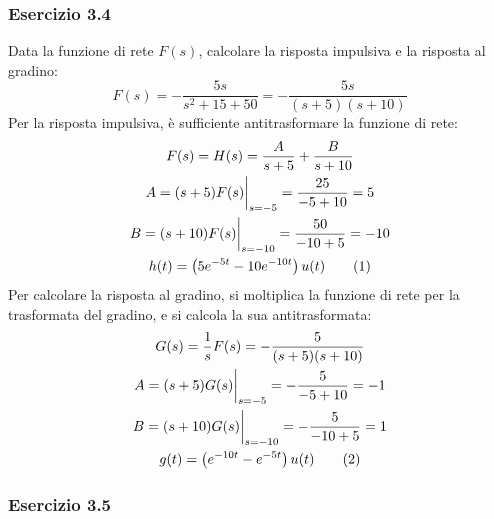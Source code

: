\documentclass{article}
\newcommand{\tageq}{\tag{\stepcounter{equation}\theequation}}
\begin{document}
\subsubsection*{Esercizio 3.4}

Data la funzione di rete $F(s)$, calcolare la risposta impulsiva e la risposta al gradino:
\begin{equation*}
    F(s)=\displaystyle-\frac{5s}{s^2+15+50}=-\frac{5s}{(s+5)(s+10)}
\end{equation*}
Per la risposta impulsiva, è sufficiente antitrasformare la funzione di rete:
\begin{gather*}
    F(s)=H(s)=\displaystyle\frac{A}{s+5}+\frac{B}{s+10}\\
    A=(s+5)F(s)\bigg|_{s=-5}=\displaystyle\frac{25}{-5+10}=5\\
    B=(s+10)F(s)\bigg|_{s=-10}=\displaystyle\frac{50}{-10+5}=-10\\
    h(t)=\displaystyle\left(5e^{-5t}-10e^{-10t}\right)u(t)\tageq
\end{gather*}
Per calcolare la risposta al gradino, si moltiplica la funzione di rete per la trasformata del gradino, e si calcola la sua antitrasformata:
\begin{gather*}
    G(s)=\displaystyle\frac{1}{s}F(s)=-\frac{5}{(s+5)(s+10)}\\
    A=(s+5)G(s)\bigg|_{s=-5}=-\frac{5}{-5+10}=-1\\
    B=(s+10)G(s)\bigg|_{s=-10}=-\frac{5}{-10+5}=1\\
    g(t)=\left(e^{-10t}-e^{-5t}\right)u(t)\tageq
\end{gather*}

\subsubsection*{Esercizio 3.5}
\end{document}
